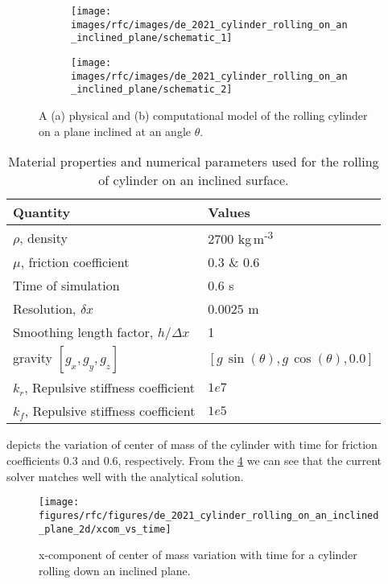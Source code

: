 \begin{figure}[!htpb]
  \centering
  \begin{subfigure}{0.48\textwidth}
    \centering
    \texttt{[image: images/rfc/images/de\_2021\_cylinder\_rolling\_on\_an\_inclined\_plane/schematic\_1]}
    \subcaption{}\label{fig:circular-body:schematic-1}
  \end{subfigure}
  \begin{subfigure}{0.48\textwidth}
    \centering
    \texttt{[image: images/rfc/images/de\_2021\_cylinder\_rolling\_on\_an\_inclined\_plane/schematic\_2]}
    \subcaption{}\label{fig:circular-body:schematic-2}
  \end{subfigure}
  \caption{A (a) physical and (b) computational model of the rolling cylinder on a
    plane inclined at an angle $\theta$.}
\label{fig:circular-body-schematic}
\end{figure}
\begin{table}[!ht]
  \centering
  \begin{tabular}[!ht]{ll}
    \toprule
    Quantity & Values\\
    \midrule
    $\rho$, density & $2700$ kg\,m\textsuperscript{-3} \\
    $\mu$, friction coefficient & $0.3$ \& $0.6$ \\
    Time of simulation & $0.6$ s \\
    Resolution, $\delta x$ & $0.0025$ m\\
    Smoothing length factor, $h/\Delta x$ & 1\\
    gravity $[g_x, g_y, g_z]$ & $[g\,\sin(\theta), g\,\cos(\theta), 0.0]$\\
    $k_r$, Repulsive stiffness coefficient & $1e7$ \\
    $k_f$, Repulsive stiffness coefficient & $1e5$ \\
    \bottomrule
  \end{tabular}
  \caption{Material properties and numerical parameters used for the rolling
    of cylinder on an inclined surface.}%
  \label{tab:circular-body-rolling-params}
\end{table}

 depicts the variation of center of mass of
the cylinder with time for friction coefficients $0.3$ and $0.6$,
respectively. From the \cref{fig:cylinder-xcom-vs-time} we can see that the
current solver matches well with the analytical solution.
\begin{figure}[!htpb]
  \centering
  \texttt{[image: figures/rfc/figures/de\_2021\_cylinder\_rolling\_on\_an\_inclined\_plane\_2d/xcom\_vs\_time]}
  \caption{x-component of center of mass variation with time for a cylinder
    rolling down an inclined plane.}
\label{fig:cylinder-xcom-vs-time}
\end{figure}


